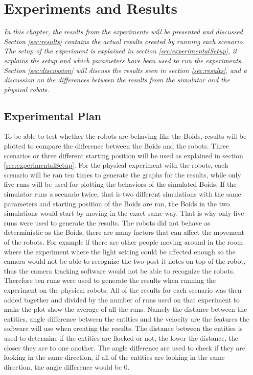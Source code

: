 \chapter{Experiments and Results}
\label{cha:ResearchAndResults}

{\it In this chapter, the results from the experiments will be presented and discussed. Section \ref{sec:results} contains the actual results created by running each scenario. The setup of the experiment is explained in section \ref{sec:experimentalSetup}, it explains the setup and which parameters have been used to run the experiments.
Section \ref{sec:discussion} will discuss the results seen in section \ref{sec:results}, and a discussion on the differences between the results from the simulator and the physical robots.}

\section{Experimental Plan}
\label{sec:experimentalPlan}
To be able to test whether the robots are behaving like the Boids, results will be plotted to compare the difference between the Boids and the robots. 
Three scenarios or three different starting position will be used as explained in section \ref{sec:experimentalSetup}.
For the physical experiment with the robots, each scenario will be ran ten times to generate the graphs for the results, while only five runs will be used for plotting the behaviors of the simulated Boids. 
If the simulator runs a scenario twice, that is two different simulations with the same parameters and starting position of the Boids are ran, the Boids in the two simulations would start by moving in the exact same way. That is why only five runs were used to generate the results.
The robots did not behave as deterministic as the Boids, there are many factors that can affect the movement of the robots. For example if there are other people moving around in the room where the experiment where the light setting could be affected enough so the camera would not be able to recognize the two post it notes on top of the robot, thus the camera tracking software would not be able to recognize the robots.
Therefore ten runs were used to generate the results when running the experiment on the physical robots. 
All of the results for each scenario was then added together and divided by the number of runs used on that experiment to make the plot show the average of all the runs.
Namely the distance between the entities, angle difference between the entities and the velocity are the features the software will use when creating the results.
The distance between the entities is used to determine if the entities are flocked or not, the lower the distance, the closer they are to one another.
The angle difference are used to check if they are looking in the same direction, if all of the entities are looking in the same direction, the angle difference would be 0.

